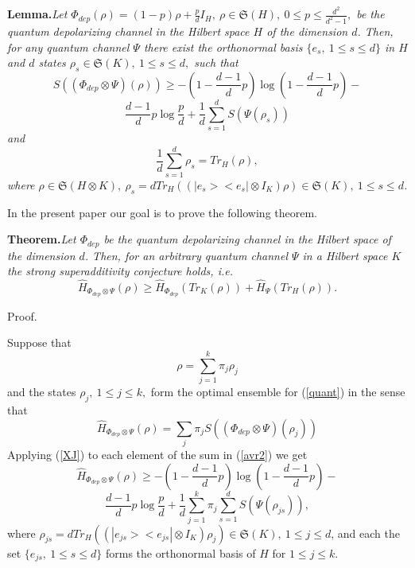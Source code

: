 \documentclass[twocolumn,showpacs,preprintnumbers,amsmath,amssymb]{revtex4}
\begin{document}
{\bf Lemma.}{\it Let $\Phi _{dep}(\rho)=(1-p)\rho+\frac
{p}{d}I_{H},\ \rho\in \mathfrak{S} (H),\ 0\le p\le \frac
{d^{2}}{d^{2}-1},$ be the quantum depolarizing channel in the
Hilbert space $H$ of the dimension $d$. Then, for any quantum
channel $\Psi $ there exist the orthonormal basis $\{e_{s},\ 1\le
s\le d\}$ in $H$ and $d$ states $\rho_{s}\in \mathfrak {S}(K),\
1\le s\le d,$ such that
\begin {equation}\label {XJ}
S((\Phi _{dep}\otimes \Psi)(\rho))\ge -(1-\frac {d-1}{d}p)\log
(1-\frac {d-1}{d}p)-
\end {equation}
$$
\frac {d-1}{d}p\log \frac {p}{d}+ \frac {1}{d}\sum \limits
_{s=1}^{d}S(\Psi (\rho_{s}))
$$
and
$$
\frac {1}{d}\sum \limits _{s=1}^{d}\rho _{s}=Tr_{H}(\rho ),
$$
where $\rho\in \mathfrak{S} (H\otimes K),\
\rho_{s}=dTr_{H}((|e_{s}><e_{s}|\otimes I_{K})\rho)\in \mathfrak
{S} (K),\ 1\le s\le d$. }




In the present paper our goal is to prove the following theorem.


{\bf Theorem.}{\it Let $\Phi _{dep}$ be the quantum depolarizing
channel in the Hilbert space of the dimension $d$. Then, for an
arbitrary quantum channel $\Psi $ in a Hilbert space $K$ the
strong superadditivity conjecture holds, i.e.
\begin {equation}\label {theorem}
\hat H_{\Phi _{dep}\otimes \Psi}(\rho)\ge \hat H_{\Phi
_{dep}}(Tr_{K}(\rho))+\hat H_{\Psi}(Tr_{H}(\rho)).
\end {equation}
}


Proof.



Suppose that
\begin {equation}\label {avr}
\rho =\sum \limits _{j=1}^{k}\pi _{j}\rho _{j}
\end {equation}
and the states $\rho _{j},\ 1\le j\le k,$ form the optimal
ensemble for (\ref {quant}) in the sense that
\begin {equation}\label {avr2}
\hat H_{\Phi _{dep}\otimes \Psi}(\rho)=\sum \limits _{j} \pi
_{j}S((\Phi _{dep}\otimes \Psi)(\rho _{j}))
\end {equation}
Applying (\ref {XJ}) to each element of the sum in (\ref {avr2})
we get
\begin {equation}\label {A1}
\hat H_{\Phi _{dep}\otimes \Psi}(\rho)\ge -(1-\frac
{d-1}{d}p)\log (1-\frac {d-1}{d}p)-
\end {equation}
$$
\frac {d-1}{d}p\log \frac {p}{d}+\frac {1}{d}\sum \limits
_{j=1}^{k}\pi _{j}\sum \limits _{s=1}^{d}S(\Psi (\rho_{js})),
$$
where $\rho_{js}=dTr_{H}((|e_{js}><e_{js}|\otimes I_{K})\rho
_{j})\in \mathfrak {S} (K),\ 1\le j\le d$, and each the set
$\{e_{js},\ 1\le s\le d\}$ forms the orthonormal basis of $H$ for
$1\le j\le k$.
\end{document}
